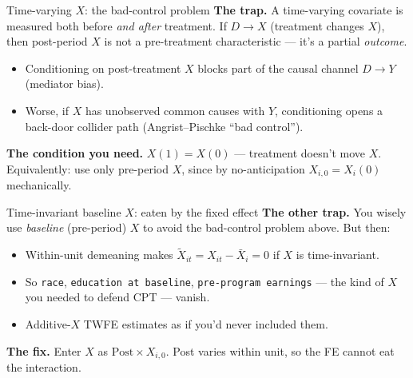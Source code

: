 \documentclass[aspectratio=169,11pt]{beamer}
\begin{document}
\begin{frame}{Time-varying $X$: the bad-control problem}
\vspace{0.4em}
\textbf{The trap.} \;A time-varying covariate is measured both before \textit{and after} treatment. If $D \to X$ (treatment changes $X$), then post-period $X$ is not a pre-treatment characteristic --- it's a partial \textit{outcome}.
\vspace{0.6em}
\begin{itemize}\setlength\itemsep{0.4em}
  \item Conditioning on post-treatment $X$ blocks part of the causal channel $D \to Y$ (mediator bias).
  \item Worse, if $X$ has unobserved common causes with $Y$, conditioning opens a back-door collider path (Angrist--Pischke ``bad control'').
\end{itemize}
\vspace{0.5em}
\textbf{The condition you need.} \;$X(1) = X(0)$ --- treatment doesn't move $X$. \;Equivalently: use only pre-period $X$, since by no-anticipation $X_{i,0} = X_i(0)$ mechanically.
\vspace{0.4em}
\end{frame}

\begin{frame}{Time-invariant baseline $X$: eaten by the fixed effect}
\vspace{0.4em}
\textbf{The other trap.} \;You wisely use \textit{baseline} (pre-period) $X$ to avoid the bad-control problem above. But then:
\vspace{0.6em}
\begin{itemize}\setlength\itemsep{0.4em}
  \item Within-unit demeaning makes $\tilde{X}_{it} = X_{it} - \bar{X}_i = 0$ if $X$ is time-invariant.
  \item So \texttt{race}, \texttt{education at baseline}, \texttt{pre-program earnings} --- the kind of $X$ you needed to defend CPT --- vanish.
  \item Additive-$X$ TWFE estimates as if you'd never included them.
\end{itemize}
\vspace{0.5em}
\textbf{The fix.} \;Enter $X$ as $\text{Post} \times X_{i,0}$. \;Post varies within unit, so the FE cannot eat the interaction.
\vspace{0.4em}
\end{frame}
\end{document}
